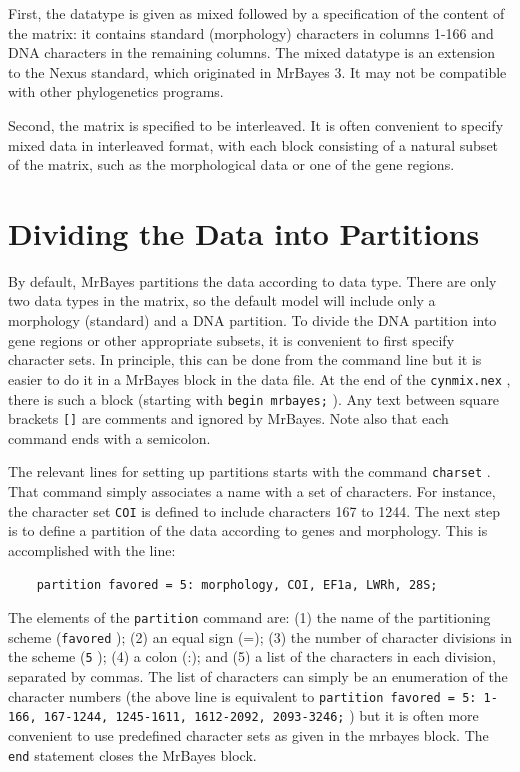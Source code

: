 \documentclass[12pt]{book}
\newcommand{\ttt}[1]{\texttt{#1} }
\begin{document}
First, the datatype is given as mixed followed by a specification of the content of the matrix: it
contains standard (morphology) characters in columns 1-166 and DNA characters in the remaining
columns. The mixed datatype is an extension to the Nexus standard, which originated in MrBayes 3.
It may not be compatible with other phylogenetics programs.

Second, the matrix is specified to be interleaved. It is often convenient to specify mixed data in
interleaved format, with each block consisting of a natural subset of the matrix, such as the
morphological data or one of the gene regions.

\section{Dividing the Data into Partitions}

By default, MrBayes partitions the data according to data type. There are only two data types in
the matrix, so the default model will include only a morphology (standard) and a DNA partition. To
divide the DNA partition into gene regions or other appropriate subsets, it is convenient to first
specify character sets.  In principle, this can be done from the command line but it is easier to
do it in a MrBayes block in the data file. At the end of the \ttt{cynmix.nex}, there is such a
block (starting with \ttt{begin mrbayes;}).  Any text between square brackets \ttt{[]} are
comments and ignored by MrBayes.  Note also that each command ends with a semicolon.

The relevant lines for setting up partitions starts with the command \ttt{charset}. That command
simply associates a name with a set of characters. For instance, the character set \ttt{COI} is
defined to include characters 167 to 1244. The next step is to define a partition of the data
according to genes and morphology. This is accomplished with the line:

\begin{singlespacing}
\begin{verbatim}
    partition favored = 5: morphology, COI, EF1a, LWRh, 28S;
\end{verbatim}
\end{singlespacing}

The elements of the \ttt{partition} command are: (1) the name of the partitioning scheme
(\ttt{favored}); (2) an equal sign (=); (3) the number of character divisions in the scheme
(\ttt{5}); (4) a colon (:); and (5) a list of the characters in each division, separated by
commas. The list of characters can simply be an enumeration of the character numbers (the above
line is equivalent to \ttt{partition favored = 5: 1-166, 167-1244, 1245-1611, 1612-2092,
2093-3246;}) but it is often more convenient to use predefined character sets as given in the
mrbayes block.  The \ttt{end} statement closes the MrBayes block.
\end{document}
